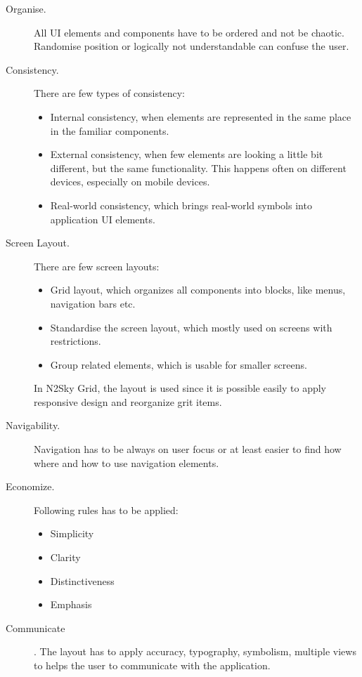 \begin{description}
\item[Organise.]  All UI elements and components have to be ordered and not be chaotic. Randomise position or logically not understandable can confuse the user. 
\item[Consistency.] There are few types of consistency:
\begin{itemize}
\item Internal consistency, when elements are represented in the same place in the familiar components. 
\item External consistency, when few elements are looking a little bit different, but the same functionality. This happens often on different devices, especially on mobile devices.
\item Real-world consistency, which brings real-world symbols into application UI elements.
\end{itemize}
\item[Screen Layout.] There are few screen layouts: 
\begin{itemize}
\item Grid layout, which organizes all components into blocks, like menus, navigation bars etc. 
\item Standardise the screen layout, which mostly used on screens with restrictions.
\item Group related elements, which is usable for smaller screens.
\end{itemize}

In N2Sky Grid, the layout is used since it is possible easily to apply responsive design and reorganize grit items. 

\item[Navigability.] Navigation has to be always on user focus or at least easier to find how where and how to use navigation elements.
\item[Economize.] Following rules has to be applied: 
\begin{itemize}
\item Simplicity
\item Clarity
\item Distinctiveness
\item Emphasis
\end{itemize}
\item[Communicate]. The layout has to apply accuracy, typography, symbolism, multiple views to helps the user to communicate with the application.
\end{description}


